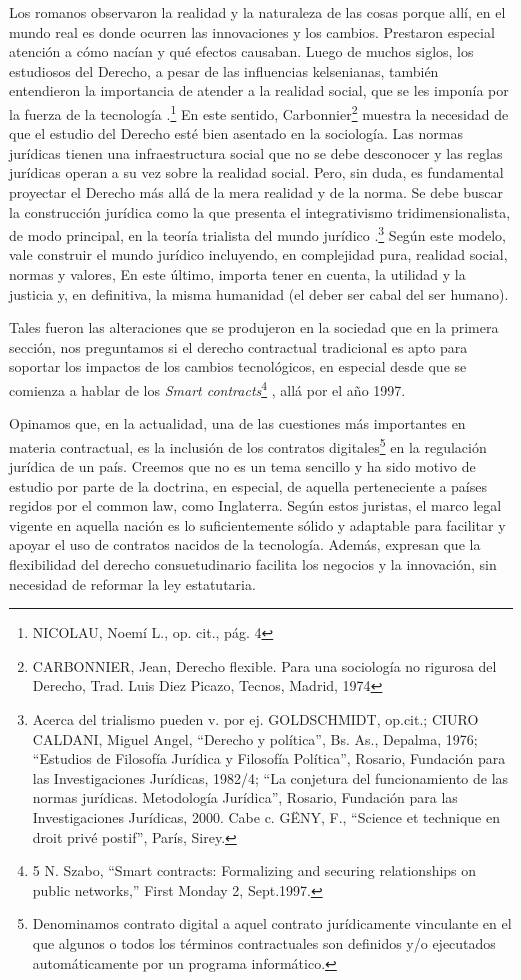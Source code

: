 \documentclass[12pt]{report} %
\begin{document}
\begin{itemize}
Los romanos observaron la realidad y la naturaleza de las cosas porque allí, en el mundo real es donde ocurren las innovaciones y los cambios. Prestaron especial atención a cómo nacían y qué efectos causaban. Luego de muchos siglos, los estudiosos del Derecho, a pesar de las influencias kelsenianas, también entendieron la importancia de atender a la realidad social, que se les imponía por la fuerza de la tecnología .\footnote{NICOLAU, Noemí L., op. cit., pág. 4} En este sentido, Carbonnier\footnote{CARBONNIER, Jean, Derecho flexible. Para una sociología no rigurosa del Derecho, Trad. Luis Diez Picazo, Tecnos, Madrid, 1974}  muestra la necesidad de que el estudio del Derecho esté bien asentado en la sociología. Las normas jurídicas tienen una infraestructura social que no se debe desconocer y las reglas jurídicas operan a su vez sobre la realidad social. Pero, sin duda, es fundamental proyectar el Derecho más allá de la mera realidad y de la norma. Se debe buscar la construcción jurídica como la que presenta el integrativismo tridimensionalista, de modo principal, en la teoría trialista del mundo jurídico   .\footnote{Acerca del trialismo pueden v. por ej. GOLDSCHMIDT, op.cit.; CIURO CALDANI, Miguel Angel, “Derecho y política”, Bs. As., Depalma, 1976; “Estudios de Filosofía Jurídica y Filosofía Política”, Rosario, Fundación para las Investigaciones Jurídicas, 1982/4; “La conjetura del funcionamiento de las normas jurídicas. Metodología Jurídica”, Rosario, Fundación para las Investigaciones Jurídicas, 2000. Cabe c. GËNY, F., “Science et technique en droit privé postif”, París, Sirey.} Según este modelo, vale construir el mundo jurídico incluyendo, en complejidad pura, realidad social, normas y valores, En este último, importa tener en cuenta, la utilidad y la justicia y, en definitiva, la misma humanidad (el deber ser cabal del ser humano).

Tales fueron las alteraciones que se produjeron en la sociedad que en la primera sección, nos preguntamos si el derecho contractual tradicional es apto para soportar los impactos de los cambios tecnológicos, en especial desde que se comienza a hablar de los \textit{Smart contracts}\footnote{5 N. Szabo, “Smart contracts: Formalizing and securing relationships on public networks,” First Monday 2, Sept.1997.} , allá por el año 1997.

Opinamos  que, en la actualidad, una de las cuestiones más importantes en materia contractual, es la inclusión de los contratos digitales\footnote{Denominamos contrato digital a aquel contrato jurídicamente vinculante en el que algunos o todos los términos contractuales son definidos y/o ejecutados automáticamente por un programa informático.}  en la regulación jurídica de un país. Creemos que no es un tema sencillo y ha sido motivo de estudio por parte de la doctrina, en especial, de aquella perteneciente a países regidos por el common law, como Inglaterra. Según estos juristas, el marco legal vigente en aquella nación es lo suficientemente sólido y adaptable para facilitar y apoyar el uso de contratos nacidos de la tecnología. Además, expresan que la flexibilidad del derecho consuetudinario facilita los negocios y la innovación, sin necesidad de reformar la ley estatutaria. 


\end{itemize}
\end{document}
